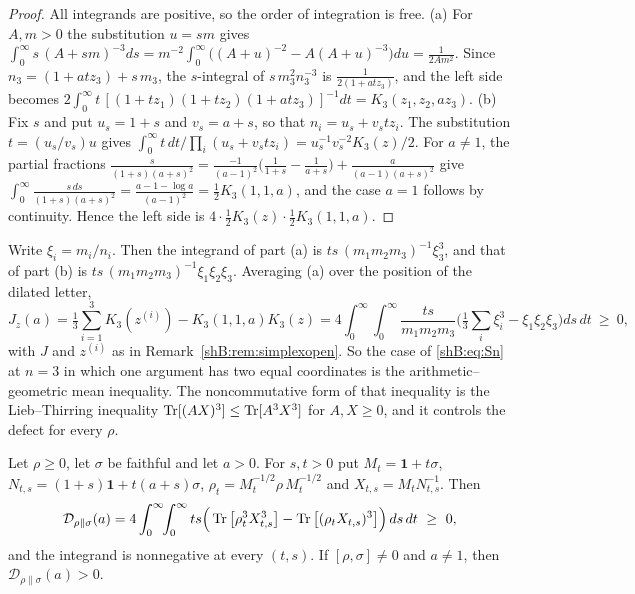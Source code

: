 \begin{proof}
All integrands are positive, so the order of integration is free. (a) For $A,m>0$ the substitution $u=sm$ gives $\int_0^\infty s\,(A+sm)^{-3}ds=m^{-2}\int_0^\infty\big((A+u)^{-2}-A(A+u)^{-3}\big)du=\frac1{2Am^2}$. Since $n_3=(1+atz_3)+s\,m_3$, the $s$-integral of $s\,m_3^2n_3^{-3}$ is $\frac1{2(1+atz_3)}$, and the left side becomes $2\int_0^\infty t\,[(1+tz_1)(1+tz_2)(1+atz_3)]^{-1}dt=K_3(z_1,z_2,az_3)$.
(b) Fix $s$ and put $u_s=1+s$ and $v_s=a+s$, so that $n_i=u_s+v_stz_i$. The substitution $t=(u_s/v_s)u$ gives $\int_0^\infty t\,dt/\prod_i(u_s+v_stz_i)=u_s^{-1}v_s^{-2}K_3(z)/2$. For $a\ne1$, the partial fractions $\frac{s}{(1+s)(a+s)^2}=\frac{-1}{(a-1)^2}\big(\frac1{1+s}-\frac1{a+s}\big)+\frac{a}{(a-1)(a+s)^2}$ give $\int_0^\infty\frac{s\,ds}{(1+s)(a+s)^2}=\frac{a-1-\log a}{(a-1)^2}=\frac12K_3(1,1,a)$, and the case $a=1$ follows by continuity. Hence the left side is $4\cdot\frac12K_3(z)\cdot\frac12K_3(1,1,a)$.
\end{proof}

Write $\xi_i=m_i/n_i$. Then the integrand of part (a) is $ts\,(m_1m_2m_3)^{-1}\xi_3^3$, and that of part (b) is $ts\,(m_1m_2m_3)^{-1}\xi_1\xi_2\xi_3$. Averaging (a) over the position of the dilated letter,
\[
J_z(a)=\tfrac13\sum_{i=1}^3K_3(z^{(i)})-K_3(1,1,a)K_3(z)=4\int_0^\infty\!\!\int_0^\infty\frac{ts}{m_1m_2m_3}\Big(\tfrac13\sum_i\xi_i^3-\xi_1\xi_2\xi_3\Big)ds\,dt\ \ge\ 0,
\]
with $J$ and $z^{(i)}$ as in Remark~\ref{shB:rem:simplexopen}. So the case of \eqref{shB:eq:Sn} at $n=3$ in which one argument has two equal coordinates is the arithmetic--geometric mean inequality. The noncommutative form of that inequality is the Lieb--Thirring inequality $\operatorname{Tr}[(AX)^3]\le\operatorname{Tr}[A^3X^3]$ for $A,X\ge0$, and it controls the defect for every $\rho$.

\begin{theorem}\label{shB:thm:LT}
Let $\rho\ge0$, let $\sigma$ be faithful and let $a>0$. For $s,t>0$ put $M_t=\mathbf 1+t\sigma$, $N_{t,s}=(1+s)\mathbf 1+t(a+s)\sigma$, $\rho_t=M_t^{-1/2}\rho\,M_t^{-1/2}$ and $X_{t,s}=M_tN_{t,s}^{-1}$. Then
\[
\mathcal D_{\rho\|\sigma}(a)=4\int_0^\infty\!\!\int_0^\infty ts\Big(\Tr\big[\rho_t^3X_{t,s}^3\big]-\Tr\big[(\rho_tX_{t,s})^3\big]\Big)\,ds\,dt\ \ge\ 0,
\]
and the integrand is nonnegative at every $(t,s)$. If $[\rho,\sigma]\ne0$ and $a\ne1$, then $\mathcal D_{\rho\|\sigma}(a)>0$.
\end{theorem}

